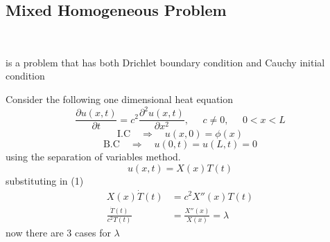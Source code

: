 \documentclass[]{article}
\begin{document}
\subsection{Mixed Homogeneous Problem}
\ 
\begin{definition}
    is a problem that has both Drichlet boundary condition and Cauchy initial condition
\end{definition}
Consider the following one dimensional heat equation 
\begin{equation}
\frac{\partial u(x,t)}{\partial t} = c^2\frac{\partial^2 u(x,t)}{\partial x^2}, \;\;\;\;\; c\neq0, \;\;\;\;\; 0<x<L
\end{equation}
\begin{equation}
\text{I.C} \quad \Longrightarrow \quad u(x,0) = \phi(x)
\end{equation}
\begin{equation}
\text{B.C} \quad \Longrightarrow \quad u(0,t) = u(L,t) = 0
\end{equation}
using the separation of variables method.
\begin{equation}
u(x,t) = X(x)T(t)
\end{equation}
substituting in (1)
\begin{align*}
X(x)\dot{T}(t) &= c^2 X''(x)T(t)
\\
\frac{\dot{T}(t)}{c^2 T(t)} &= \frac{X''(x)}{X(x)} = \lambda
\end{align*}
now there are 3 cases for $\lambda$
\end{document}
